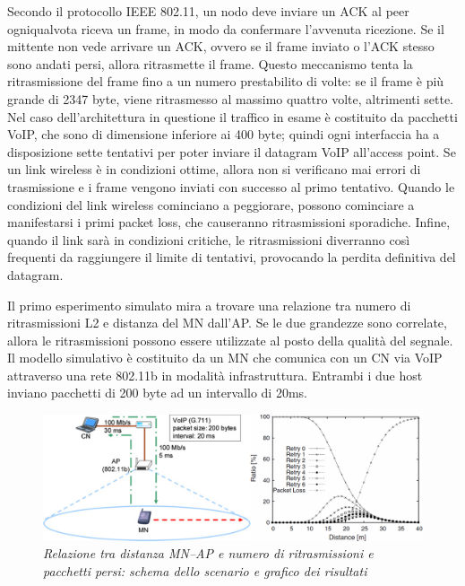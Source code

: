 \documentclass[12pt,a4paper,openright,twoside]{book}
\begin{document}
Secondo il protocollo IEEE 802.11, un nodo deve inviare un ACK al peer
ogniqualvota riceva un frame, in modo da confermare l'avvenuta
ricezione. Se il mittente non vede arrivare un ACK, ovvero se il frame
inviato o l'ACK stesso sono andati persi, allora ritrasmette il
frame. Questo meccanismo tenta la ritrasmissione del frame fino a un
numero prestabilito di volte: se il frame è più grande di 2347 byte,
viene ritrasmesso al massimo quattro volte, altrimenti sette. Nel caso
dell'architettura in questione il traffico in esame è costituito da
pacchetti VoIP, che sono di dimensione inferiore ai 400 byte; quindi
ogni interfaccia ha a disposizione sette tentativi per poter inviare
il datagram VoIP all'access point. Se un link wireless è in condizioni
ottime, allora non si verificano mai errori di trasmissione e i frame
vengono inviati con successo al primo tentativo. Quando le condizioni
del link wireless cominciano a peggiorare, possono cominciare a
manifestarsi i primi packet loss, che causeranno ritrasmissioni
sporadiche. Infine, quando il link sarà in condizioni critiche, le
ritrasmissioni diverranno così frequenti da raggiungere il limite di
tentativi, provocando la perdita definitiva del datagram.

Il primo esperimento simulato mira a trovare una relazione tra numero
di ritrasmissioni L2 e distanza del MN dall'AP. Se le due grandezze
sono correlate, allora le ritrasmissioni possono essere utilizzate al
posto della qualità del segnale. Il modello simulativo è costituito da
un MN che comunica con un CN via VoIP attraverso una rete 802.11b in
modalità infrastruttura. Entrambi i due host inviano pacchetti di 200
byte ad un intervallo di 20ms.

\begin{figure}
\centering
\includegraphics[width=\textwidth]{img/mona-distance-signal-strength-simulation}
\caption{\em Relazione tra distanza MN--AP e numero di ritrasmissioni e
  pacchetti persi: schema dello scenario e grafico dei risultati}
\label{fig:mona-distance-signal-strength-simulation}
\end{figure}
\end{document}
